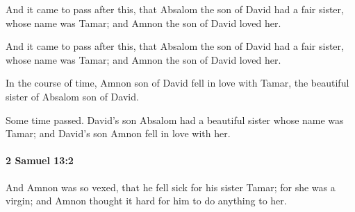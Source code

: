 			And it came to pass after this, that Absalom the son of David had a fair sister, whose name was Tamar; and Amnon the son of David loved her.

			\begin{versebox}
					\item[BHS] 
					\item[ASV] And it came to pass after this, that Absalom the son of David had a fair sister, whose name was Tamar; and Amnon the son of David loved her.
					\item[NIV] In the course of time, Amnon son of David fell in love with Tamar, the beautiful sister of Absalom son of David.
					\item[NRSV] Some time passed. David’s son Absalom had a beautiful sister whose name was Tamar; and David’s son Amnon fell in love with her.
			\end{versebox}

		\paragraph{2 Samuel 13:2} %
			\label{2SAMUEL-13-2}

			And Amnon was so vexed, that he fell sick for his sister Tamar; for she was a virgin; and Amnon thought it hard for him to do anything to her.


